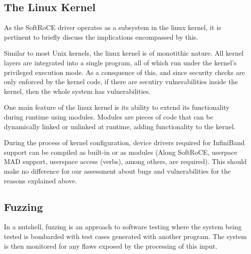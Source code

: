 
\subsection{The Linux Kernel}


As the SoftRoCE driver operates as a subsystem in the linux kernel, it is pertinent to briefly
discuss the implications encompassed by this.

Similar to most Unix kernels, the linux kernel is of monotithic nature. All kernel layers
are integrated into a single program, all of which run under the kernel's privileged execution
mode. As a consquence of this, and since security checks are only enforced by the kernel code,
if there are secutiry vulnerabilities inside the kernel, then the whole system has vulnerabilities.

One main feature of the linux kernel is its ability to extend its functionality during runtime using
modules. Modules are pieces of code that can be dynamically linked or unlinked at runtime,
adding functionality to the kernel\cite{korbethLinuxDeviceDrivers2005}.

During the process of kernel configuration, device drivers required for InfiniBand support can
be compiled as built-in or as modules (Along SoftRoCE, userpace MAD support,
userspace access (verbs), among others, are required). This should make no difference for our assessment
about bugs and vulnerabilities for the reasons explained above.


\subsection{Fuzzing}

In a nutshell, fuzzing is an approach to software testing where the system being tested is bombarded with test cases generated with another program. The system is then monitored for any flaws exposed by the processing of
this input\cite{mcnallyFuzzingStateArt2012}.

